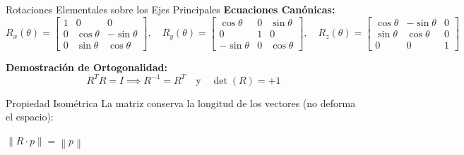 \documentclass[aspectratio=169]{beamer}
\begin{document}
\begin{frame}{Rotaciones Elementales sobre los Ejes Principales}
    \textbf{Ecuaciones Canónicas:}
    \vspace{0.1cm}
    \small
    \begin{equation*}
        R_x(\theta) = \begin{bmatrix} 1 & 0 & 0 \\ 0 & \cos\theta & -\sin\theta \\ 0 & \sin\theta & \cos\theta \end{bmatrix}, \quad
        R_y(\theta) = \begin{bmatrix} \cos\theta & 0 & \sin\theta \\ 0 & 1 & 0 \\ -\sin\theta & 0 & \cos\theta \end{bmatrix}, \quad
        R_z(\theta) = \begin{bmatrix} \cos\theta & -\sin\theta & 0 \\ \sin\theta & \cos\theta & 0 \\ 0 & 0 & 1 \end{bmatrix}
    \end{equation*}
    
    \vspace{0.3cm}
    \normalsize
    \textbf{Demostración de Ortogonalidad:}
    \begin{equation*}
        R^T R = I \implies R^{-1} = R^T \quad \text{y} \quad \det(R) = +1
    \end{equation*}
    
    \vspace{0.3cm}
    \begin{alertblock}{Propiedad Isométrica}
        La matriz conserva la longitud de los vectores (no deforma el espacio): \\ 
        \centerline{$\left\| R \cdot p \right\| = \left\| p \right\|$}
    \end{alertblock}
\end{frame}
\end{document}
